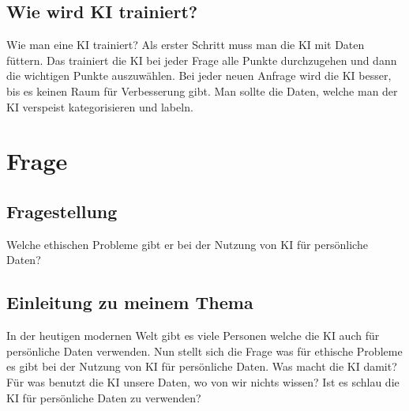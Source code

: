 \documentclass{report}
\begin{document}
\section{Wie wird KI trainiert?}
Wie man eine KI trainiert? Als erster Schritt muss man die KI mit Daten
füttern. Das trainiert die KI bei jeder Frage alle Punkte durchzugehen und
dann die wichtigen Punkte auszuwählen. Bei jeder neuen Anfrage wird die
KI besser, bis es keinen Raum für Verbesserung gibt. Man sollte die Daten,
welche man der KI verspeist kategorisieren und labeln.

\chapter{Frage}

\section{Fragestellung}
Welche ethischen Probleme gibt er bei der Nutzung von KI für persönliche Daten?

\section{Einleitung zu meinem Thema}
In der heutigen modernen Welt gibt es viele Personen welche die KI auch
für persönliche Daten verwenden. Nun stellt sich die Frage was für ethische Probleme es gibt bei der Nutzung von KI für persönliche Daten. Was
macht die KI damit? Für was benutzt die KI unsere Daten, wo von wir
nichts wissen? Ist es schlau die KI für persönliche Daten zu verwenden?
\end{document}
